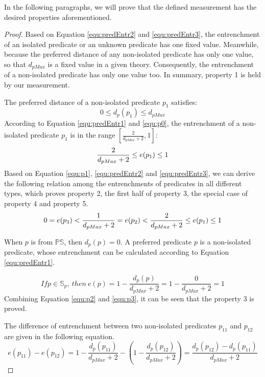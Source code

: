 \documentclass[11pt,letterpaper]{article}
\newcommand{\ps}{\mathbb{PS}}
\begin{document}
In the following paragraphs, we will prove that the defined measurement has the desired properties aforementioned. 
\begin{proof}

Based on Equation \ref{equ:predEntr2} and \ref{equ:predEntr3}, the entrenchment of an isolated predicate or an unknown predicate has one fixed value. Meanwhile, because the preferred distance of any non-isolated predicate has only one value, so that $d_{pMax}$ is a fixed value in a given theory. Consequently, the entrenchment of a non-isolated predicate has only one value too. In summary, property 1 is held by our measurement.

The preferred distance of a non-isolated predicate $p_{1}$ satisfies:
\begin{equation}\label{equ:p0}
  0 \leq d_{p}(p_{1}) \leq d_{pMax}
\end{equation}
According to Equation \ref{equ:predEntr1} and  \ref{equ:p0},  the entrenchment of a non-isolated predicate $p_{1}$ is in the range $[\frac{2}{d_{pMax}+2}, 1]$: 
\begin{equation}\label{equ:p1}
    \frac{2}{d_{pMax}+2} \leq e(p_{1})\leq  1 \\
\end{equation}
Based on Equation \ref{equ:p1}, \ref{equ:predEntr2} and \ref{equ:predEntr3}, we can derive the following relation among the entrenchments of predicates in all different types, which proves  property 2, the first half of  property 3, the special case of  property 4 and  property 5.
\begin{equation}\label{equ:p2}
    0= e(p_{3}) < \frac{1}{d_{pMax}+2}= e(p_{2}) < \frac{2}{d_{pMax}+2} \leq e(p_{1})\leq  1 \\
\end{equation}

 When $p$ is from $\ps$, then $d_{p}(p) = 0$. A preferred predicate $p$ is a non-isolated predicate, whose entrenchment can be calculated according to Equation \ref{equ:predEntr1}.
 
 \begin{equation}\label{equ:p3}
   If p \in \mathbb{S}_{p},\ then\  e(p) =1- \frac{d_{p}(p)}{d_{pMax}+2} = 1 - \frac{0}{d_{pMax}+2} =1
 \end{equation}
Combining Equation \ref{equ:p2} and \ref{equ:p3}, it can be seen that the property 3 is  proved. 

The difference of entrenchment between two non-isolated predicates $p_{11}$ and $p_{12}$ are given in the following equation.
 \begin{equation}\label{equ:p4}
   e(p_{11}) - e(p_{12}) =1- \frac{d_{p}(p_{11})}{d_{pMax}+2} - (1- \frac{d_{p}(p_{12})}{d_{pMax}+2}) = \frac{d_{p}(p_{12}) - d_{p}(p_{11})}{d_{pMax}+2}
 \end{equation}


\end{proof}
\end{document}
